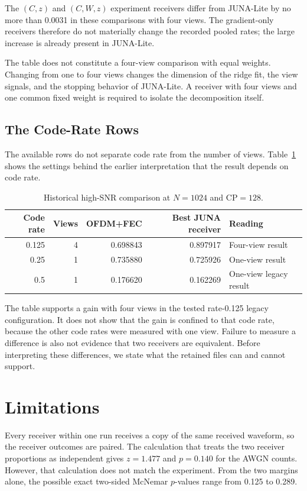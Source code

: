 \documentclass[11pt]{article}
\begin{document}
The $(C,z)$ and $(C,W,z)$ experiment receivers differ from JUNA-Lite by no
more than 0.0031 in these comparisons with four views.  The gradient-only
receivers therefore do not materially change the recorded pooled rates; the
large increase is already present in JUNA-Lite.

The table does not constitute a four-view comparison with equal weights.
Changing from one to four views changes the dimension of the ridge fit, the
view signals, and the stopping behavior of JUNA-Lite.  A receiver with four
views and one common fixed weight is required to isolate the decomposition
itself.

\subsection{The Code-Rate Rows}

The available rows do not separate code rate from the number of views.
Table~\ref{tab:rate} shows the settings behind the earlier interpretation that
the result depends on code rate.

\begin{table}[ht]
\centering
\caption{Historical high-SNR comparison at $N=1024$ and CP$=128$.}
\label{tab:rate}
\begin{tabular}{@{}rrrrl@{}}
\toprule
Code rate & Views & OFDM+FEC & Best JUNA receiver & Reading \\
\midrule
0.125 & 4 & 0.698843 & 0.897917 & Four-view result \\
0.25  & 1 & 0.735880 & 0.725926 & One-view result \\
0.5   & 1 & 0.176620 & 0.162269 & One-view legacy result \\
\bottomrule
\end{tabular}
\end{table}

The table supports a gain with four views in the tested rate-0.125 legacy
configuration.  It does not show that the gain is confined to that code rate,
because the other code rates were measured with one view.  Failure to measure
a difference is also not evidence that two receivers are equivalent.  Before
interpreting these differences, we state what the retained files can and
cannot support.

\section{Limitations}

Every receiver within one run receives a copy of the same received waveform,
so the receiver outcomes are paired.  The calculation that treats the two receiver
proportions as independent gives $z=1.477$ and $p=0.140$ for the AWGN counts.
However, that calculation does not match
the experiment.  From the two margins alone, the possible exact two-sided
McNemar $p$-values range from 0.125 to 0.289.
\end{document}
